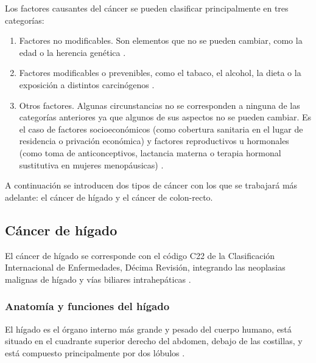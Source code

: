 Los factores causantes del cáncer se pueden clasificar principalmente en tres categorías:
\begin{enumerate}
	\item Factores no modificables. Son elementos que no se pueden cambiar, como la edad o la herencia genética \cite{WorldHealthOrganization2014, WorldHealthOrganization2020}.
	\item Factores modificables o prevenibles, como el tabaco, el alcohol, la dieta o la exposición a distintos carcinógenos \cite{Cogliano2011}.
	\item Otros factores. Algunas circunstancias no se corresponden a ninguna de las categorías anteriores ya que algunos de sus aspectos no se pueden cambiar. Es el caso de  factores socioeconómicos (como cobertura sanitaria en el lugar de residencia o privación económica) y factores reproductivos u hormonales (como toma de anticonceptivos, lactancia materna o terapia hormonal sustitutiva en mujeres menopáusicas) \cite{WorldHealthOrganization2020}.
\end{enumerate}

A continuación se introducen dos tipos de cáncer con los que se trabajará más adelante: el cáncer de hígado y el cáncer de colon-recto.


\subsection{Cáncer de hígado}

El cáncer de hígado se corresponde con el código C22 de la Clasificación Internacional de Enfermedades, Décima Revisión, integrando las neoplasias malignas de hígado y vías biliares intrahepáticas \cite{ICD10, cie10es}.

\subsubsection{Anatomía y funciones del hígado}

El hígado es el órgano interno más grande y pesado del cuerpo humano, está situado en el cuadrante superior derecho del abdomen, debajo de las costillas, y está compuesto principalmente por dos lóbulos \cite{Abdel-Misih2010}.\\

